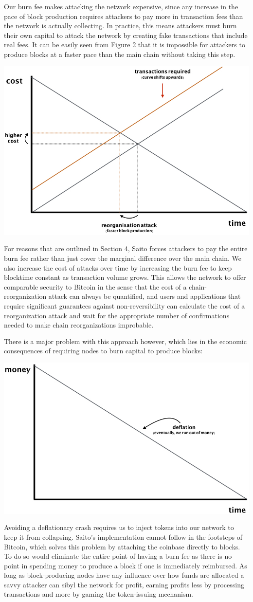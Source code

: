\documentclass[11.5pt, oneside]{article}   	%
\begin{document}
\begin{multicols}{2}
Our burn fee makes attacking the network expensive, since any increase in the pace of block production requires attackers to pay more in transaction fees than the network is actually collecting. In practice, this means attackers must burn their own capital to attack the network by creating fake transactions that include real fees. It can be easily seen from Figure 2 that it is impossible for attackers to produce blocks at a faster pace than the main chain without taking this step.

\includegraphics[width=.45\textwidth]{saito3.jpeg}

For reasons that are outlined in Section 4, Saito forces attackers to pay the entire burn fee rather than just cover the marginal difference over the main chain. We also increase the cost of attacks over time by increasing the burn fee to keep blocktime constant as transaction volume grows. This allows the network to offer comparable security to Bitcoin in the sense that the cost of a chain-reorganization attack can always be quantified, and users and applications that require significant guarantees against non-reversibility can calculate the cost of a reorganization attack and wait for the appropriate number of confirmations needed to make chain reorganizations improbable.

There is a major problem with this approach however, which lies in the economic consequences of requiring nodes to burn capital to produce blocks:

\includegraphics[width=.45\textwidth]{saito4.jpeg}

Avoiding a deflationary crash requires us to inject tokens into our network to keep it from collapsing. Saito's implementation cannot follow in the footsteps of Bitcoin, which solves this problem by attaching the coinbase directly to blocks. To do so would eliminate the entire point of having a burn fee as there is no point in spending money to produce a block if one is immediately reimbursed. As long as block-producing nodes have any influence over how funds are allocated a savvy attacker can sibyl the network for profit, earning profits less by processing transactions and more by gaming the token-issuing mechanism.


\end{multicols}
\end{document}

